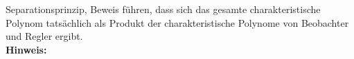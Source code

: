 \begin{question}[section=8,name={Separationsprinzip},difficulty=,type=mdl,tags={}]
	Separationsprinzip, Beweis führen, dass sich das gesamte charakteristische Polynom tatsächlich als Produkt der charakteristische Polynome von Beobachter und Regler ergibt.
	\\ \textbf{Hinweis:}\\
	
\end{question}
\begin{solution}
	
\end{solution}